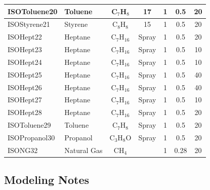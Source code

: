 \begin{table}[!ht]
\begin{tabular}{|l|l|c|c|c|c|c|}
ISOToluene20  &  Toluene      &  C$_7$H$_8$       &  17        &  1        &  0.5          &  20               \\ \hline
ISOStyrene21  &  Styrene      &  C$_8$H$_8$       &  15        &  1        &  0.5          &  20               \\ \hline
ISOHept22     &  Heptane      &  C$_7$H$_{16}$    &  Spray     &  1        &  0.5          &  20               \\ \hline
ISOHept23     &  Heptane      &  C$_7$H$_{16}$    &  Spray     &  1        &  0.5          &  10               \\ \hline
ISOHept24     &  Heptane      &  C$_7$H$_{16}$    &  Spray     &  1        &  0.5          &  10               \\ \hline
ISOHept25     &  Heptane      &  C$_7$H$_{16}$    &  Spray     &  1        &  0.5          &  40               \\ \hline
ISOHept26     &  Heptane      &  C$_7$H$_{16}$    &  Spray     &  1        &  0.5          &  40               \\ \hline
ISOHept27     &  Heptane      &  C$_7$H$_{16}$    &  Spray     &  1        &  0.5          &  10               \\ \hline
ISOHept28     &  Heptane      &  C$_7$H$_{16}$    &  Spray     &  1        &  0.5          &  20               \\ \hline
ISOToluene29  &  Toluene      &  C$_7$H$_8$       &  Spray     &  1        &  0.5          &  20               \\ \hline
ISOPropanol30 &  Propanol     &  C$_3$H$_8$O      &  Spray     &  1        &  0.5          &  20               \\ \hline
ISONG32       &  Natural Gas  &  CH$_4$           &            &  1        &  0.28         &  20               \\ \hline
\end{tabular}
\label{tab:NIST_FSE_Exp}
\end{table}

\subsection{Modeling Notes}

